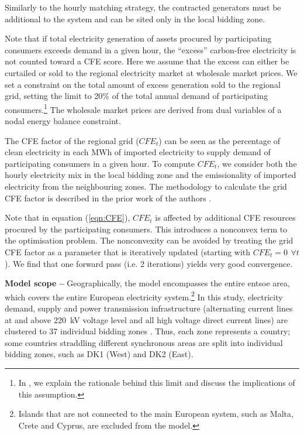 Similarly to the hourly matching strategy, the contracted generators must be additional to the system and can be sited only in the local bidding zone.

Note that if total electricity generation of assets procured by participating consumers exceeds demand in a given hour, the \enquote{excess} carbon-free electricity is not counted toward a CFE score.
Here we assume that the excess can either be curtailed or sold to the regional electricity market at wholesale market prices.
We set a constraint on the total amount of excess generation sold to the regional grid, setting the limit to 20\% of the total annual demand of participating consumers.\footnote{In , we explain the rationale behind this limit and discuss the implications of this assumption.}
The wholesale market prices are derived from dual variables of a nodal energy balance constraint. 

The CFE factor of the regional grid ($CFE_t$) can be seen as the percentage of clean electricity in each MWh of imported electricity to supply demand of participating consumers in a given hour. 
To compute $CFE_t$, we consider both the hourly electricity mix in the local bidding zone and the emissionality of imported electricity from the neighbouring zones.
The methodology to calculate the grid CFE factor is described in the prior work of the authors \cite{riepin-zenodo-systemlevel247}.

Note that in equation (\ref{eqn:CFE}), $CFE_t$ is affected by additional CFE resources procured by the participating consumers. 
This introduces a nonconvex term to the optimisation problem. 
The nonconvexity can be avoided by treating the grid CFE factor as a parameter that is iteratively updated (starting with $CFE_t =0 \,~\forall t$).
We find that one forward pass (i.e. 2 iterations) yields very good convergence.


\textbf{Model scope --} Geographically, the model encompasses the entire \gls{entsoe} area, which covers the entire European electricity system.\footnote{Islands that are not connected to the main European system, such as Malta, Crete and Cyprus, are excluded from the model.}
In this study, electricity demand, supply and power transmission infrastructure (alternating current lines at and above 220~kV voltage level and all high voltage direct current lines) are clustered to 37 individual bidding zones \cite{PyPSAEur-docs-spatialresolution}. 
Thus, each zone represents a country; some countries straddling different synchronous areas are split into individual bidding zones, such as DK1 (West) and DK2 (East).

